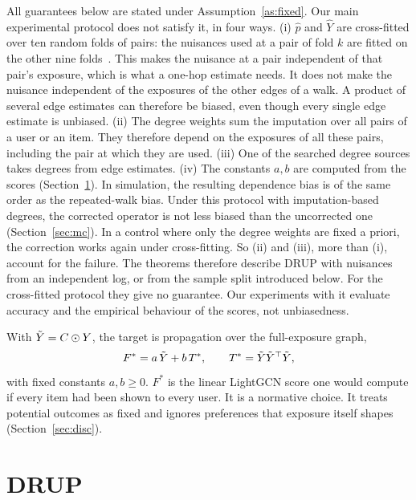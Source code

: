 \begin{remark}\label{rem:xfit}
All guarantees below are stated under Assumption~\ref{as:fixed}. Our main
experimental protocol does not satisfy it, in four ways. (i) $\hat p$ and
$\hat Y$ are cross-fitted over ten random folds of pairs: the nuisances used at
a pair of fold $k$ are fitted on the other nine
folds~\cite{chernozhukov2018dml}. This makes the nuisance at a pair
independent of that pair's exposure, which is what a one-hop estimate needs.
It does not make the nuisance independent of the exposures of the other edges
of a walk. A product of several edge estimates can therefore be biased, even
though every single edge estimate is unbiased. (ii) The degree weights sum the
imputation over all pairs of a user or an item. They therefore depend on the
exposures of all these pairs, including the pair at which they are used.
(iii) One of the searched degree sources takes degrees from edge estimates.
(iv) The constants $a,b$ are computed from the
scores (Section~\ref{sec:drup}). In simulation, the resulting dependence bias
is of the same order as the repeated-walk bias. Under this protocol with
imputation-based degrees, the corrected operator is not less biased than the
uncorrected one
(Section~\ref{sec:mc}). In a control where only the degree weights are fixed a
priori, the correction works again under cross-fitting. So (ii) and (iii), more
than (i), account for the failure. The theorems therefore describe DRUP with
nuisances from an independent log, or from the sample split introduced below.
For the cross-fitted protocol they give no guarantee. Our experiments with it
evaluate accuracy and the empirical behaviour of the scores, not
unbiasedness.
\end{remark}

With $\tilde Y=C\odot Y$, the target is propagation over the full-exposure graph,
\begin{equation}\label{eq:target}
F^*=a\,\tilde Y+b\,T^*,\qquad T^*=\tilde Y\tilde Y^\top\tilde Y ,
\end{equation}
with fixed constants $a,b\ge0$. $F^*$ is the linear LightGCN score one would
compute if every item had been shown to every user. It is a normative choice.
It treats potential outcomes as fixed and ignores preferences that exposure
itself shapes~\cite{chaney2018confounding,perdomo2020performative}
(Section~\ref{sec:disc}).

\section{DRUP}\label{sec:drup}

